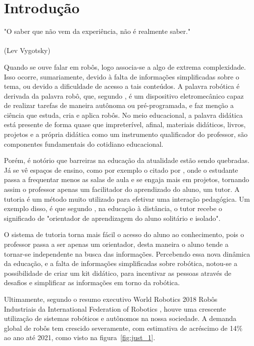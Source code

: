 \chapter{Introdução}
\label{chap:intro}
\begin{flushright}
	"O saber que não vem da experiência, não é realmente saber." \\
	\ \\
	(Lev Vygotsky)
\end{flushright}

Quando se ouve falar em robôs, logo associa-se a algo de extrema complexidade. Isso ocorre, sumariamente, devido à falta de informações simplificadas sobre o tema, ou devido a dificuldade de acesso a tais conteúdos. A palavra robótica é derivada da palavra robô, que, segundo \cite{goncalves2007}, é um dispositivo eletromecânico capaz de realizar tarefas de maneira autônoma ou pré-programada, e faz menção a ciência que estuda, cria e aplica robôs. 
No meio educacional, a palavra didática está presente de forma quase que impreterível, afinal, materiais didáticos, livros, projetos e a própria didática como um instrumento qualificador do professor, são componentes fundamentais do cotidiano educacional.

Porém, é notório que barreiras na educação da atualidade estão sendo quebradas. Já se vê espaços de ensino, como por exemplo o citado por \cite{Mataric}, onde o estudante passa a frequentar menos as salas de aula e se engaja mais em projetos, tornando assim o professor apenas um facilitador do aprendizado do aluno, um tutor. A tutoria é um método muito utilizado para efetivar uma interação pedagógica. Um exemplo disso, é que segundo \cite{sa1998}, na educação à distância, o tutor recebe o significado de "orientador de aprendizagem do aluno solitário e isolado".

O sistema de tutoria torna mais fácil o acesso do aluno ao conhecimento, pois o professor passa a ser apenas um orientador, desta maneira o aluno tende a tornar-se independente na busca das informações. Percebendo essa nova dinâmica da educação, e a falta de informações simplificadas sobre robótica, notou-se a possibilidade de criar um kit didático, para incentivar as pessoas através de desafios e simplificar as informações em torno da robótica.

Ultimamente, segundo o resumo executivo World Robotics 2018 Robôs Industriais da International Federation of Robotics \cite{ifr2018}, houve uma crescente utilização de sistemas robóticos e autônomos na nossa sociedade. A demanda global de robôs tem crescido severamente, com estimativa de acréscimo de 14\% ao ano até 2021, como visto na figura~\ref{fig:just_1}.

